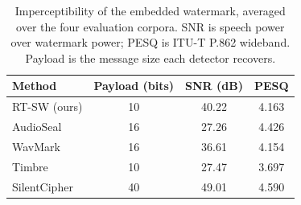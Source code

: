 \begin{table}[t]
\centering
\caption{Imperceptibility of the embedded watermark, averaged over the four
evaluation corpora. SNR is speech power over watermark power; PESQ is ITU-T
P.862 wideband. Payload is the message size each detector recovers.}
\label{tab:imperceptibility}
\begin{tabular}{lccc}
\toprule
\textbf{Method} & \textbf{Payload (bits)} & \textbf{SNR (dB)} & \textbf{PESQ} \\
\midrule
RT-SW (ours) & 10 & 40.22 & 4.163 \\
AudioSeal & 16 & 27.26 & 4.426 \\
WavMark & 16 & 36.61 & 4.154 \\
Timbre & 10 & 27.47 & 3.697 \\
SilentCipher & 40 & 49.01 & 4.590 \\
\bottomrule
\end{tabular}
\end{table}
